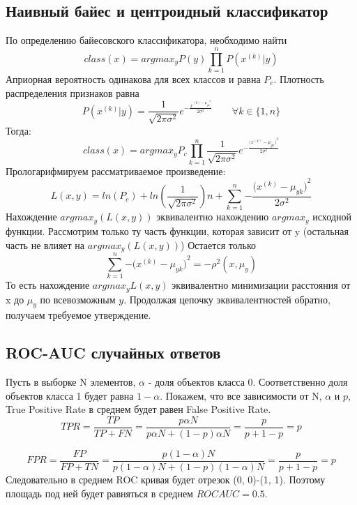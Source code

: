 \documentclass[12pt]{article}
\begin{document}
\subsection*{Наивный байес и центроидный классификатор}

По определению байесовского классификатора,
необходимо найти $$class(x) =
argmax_y {P(y)\prod_{k=1}^n}P(x^{(k)}|y)$$
Априорная вероятность одинакова для всех классов и равна $P_c$.
Плотность распределения признаков равна
$$P(x^{(k)}|y) = \frac{1}{\sqrt{2 \pi \sigma^2}}
e^{-\frac{x^{(k) - \mu_{yk}}^2}{2\sigma^2}}
\qquad \forall k \in \{ 1, n\}$$
Тогда:
$$ class(x) = argmax_y {P_c
\prod_{k=1}^n}\frac{1}{\sqrt{2 \pi \sigma^2}}
e^{-\frac {({x^{(k)} - \mu_{yk})}^2}{2\sigma^2}} $$
Прологарифмируем рассматриваемое произведение:
$$ L(x, y) = ln(P_c) + ln(\frac{1}{\sqrt{2 \pi \sigma^2}}) n
+ \sum_{k=1}^n {-\frac {({x^{(k)} - \mu_{yk})}^2}{2\sigma^2}} $$
Нахождение $argmax_y(L(x, y))$ эквивалентно нахождению
$argmax_y$ исходной функции.
Рассмотрим только ту часть функции, которая зависит от y
(остальная часть не влияет на $argmax_y(L(x, y))$)
Остается только
$$ \sum_{k=1}^n {-{(x^{(k)} - \mu_{yk}})}^2 = -\rho^2(x, \mu_y) $$
То есть нахождение $argmax_yL(x,y)$ эквивалентно минимизации расстояния от x до $\mu_y$ по всевозможным $y$. Продолжая цепочку эквивалентностей обратно, получаем требуемое утверждение.

\subsection*{ROC-AUC случайных ответов}
Пусть в выборке N элементов, $\alpha$ - доля объектов класса 0.
Соответственно доля объектов класса 1 будет равна $1 - \alpha$.
Покажем, что все зависимости от N, $\alpha$ и $p$, True Positive Rate в среднем будет равен False Positive Rate.
$$ TPR = \frac{TP}{TP + FN} =
\frac{p \alpha N}{p \alpha N + (1 - p) \alpha N} =
\frac{p}{p + 1 - p} = p $$


$$ FPR = \frac{FP}{FP + TN} =
\frac{p (1 - \alpha)N}{p (1 - \alpha)N + (1 - p) (1 - \alpha)N} =
\frac{p}{p + 1 - p} = p $$
Следовательно в среднем ROC кривая будет отрезок (0, 0)-(1, 1).
Поэтому площадь под ней будет равняться в среднем
$ROC AUC = 0.5$.
\end{document}
